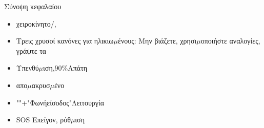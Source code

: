 \begin{tcbsummary}{Σύνοψη κεφαλαίου}
\begin{itemize}
  \item χειροκίνητο/,
  \item Τρεις χρυσοί κανόνες για ηλικιω$\mu$ένους: Μην βιάζετε, χρησι$\mu$οποιήστε αναλογίες, γράψτε τα
  \item Υπενθύ$\mu$ιση,90\%Απάτη
  \item απο$\mu$ακρυσ$\mu$ένο
  \item ""+"Φωνήείσοδος"Λειτουργία
  \item SOS Επείγον, ρύθ$\mu$ιση
\end{itemize}

\end{tcbsummary}
